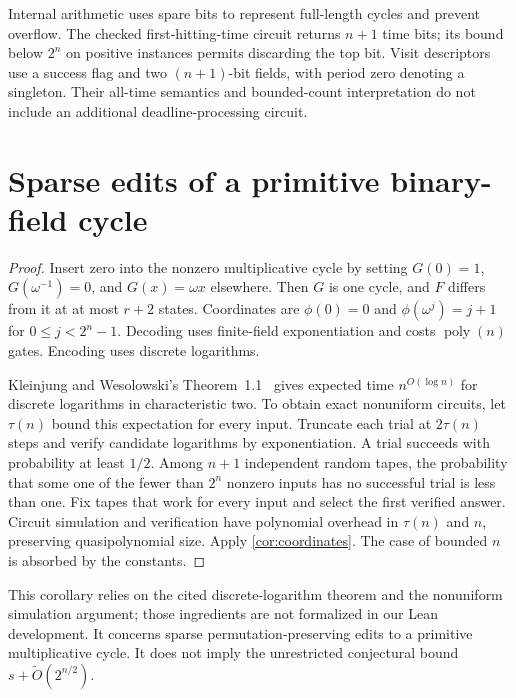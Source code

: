\documentclass[11pt]{article}
\newtheorem{corollary}[theorem]{Corollary}
\theoremstyle{definition}
\theoremstyle{remark}
\newcommand{\CC}{\mathrm{C}}
\newcommand{\poly}{\operatorname{poly}}
\numberwithin{equation}{section}
\begin{document}
Internal arithmetic uses spare bits to represent full-length cycles and
prevent overflow.  The checked first-hitting-time circuit returns $n+1$
time bits; its bound below $2^n$ on positive instances permits discarding
the top bit.  Visit descriptors use a success flag and two $(n+1)$-bit
fields, with period zero denoting a singleton.  Their all-time semantics
and bounded-count interpretation do not include an additional
deadline-processing circuit.

\section{Sparse edits of a primitive binary-field cycle}\label{app:binary-field}

\begin{proof}
Insert zero into the nonzero multiplicative cycle by setting
$G(0)=1$, $G(\omega^{-1})=0$, and $G(x)=\omega x$ elsewhere.
Then $G$ is one cycle, and $F$ differs from it at at most $r+2$ states.
Coordinates are
$\phi(0)=0$ and $\phi(\omega^j)=j+1$ for $0\leq j<2^n-1$.
Decoding uses finite-field exponentiation and costs $\poly(n)$ gates.
Encoding uses discrete logarithms.

Kleinjung and Wesolowski's Theorem~1.1~\cite{KW22} gives expected time
$n^{O(\log n)}$ for discrete logarithms in characteristic two.
To obtain exact nonuniform circuits, let $\tau(n)$ bound this expectation
for every input.  Truncate each trial at $2\tau(n)$ steps and verify
candidate logarithms by exponentiation.  A trial succeeds with probability
at least $1/2$.  Among $n+1$ independent random tapes, the probability that
some one of the fewer than $2^n$ nonzero inputs has no successful trial is
less than one.  Fix tapes that work for every input and select the first
verified answer.  Circuit simulation and verification have polynomial
overhead in $\tau(n)$ and $n$, preserving quasipolynomial size.
Apply \cref{cor:coordinates}.  The case of bounded $n$ is absorbed by
the constants.
\end{proof}

This corollary relies on the cited discrete-logarithm theorem and the
nonuniform simulation argument; those ingredients are not formalized in
our Lean development.  It concerns sparse permutation-preserving edits
to a primitive multiplicative cycle.  It does not imply the unrestricted
conjectural bound $s+\widetilde O(2^{n/2})$.
\end{document}
